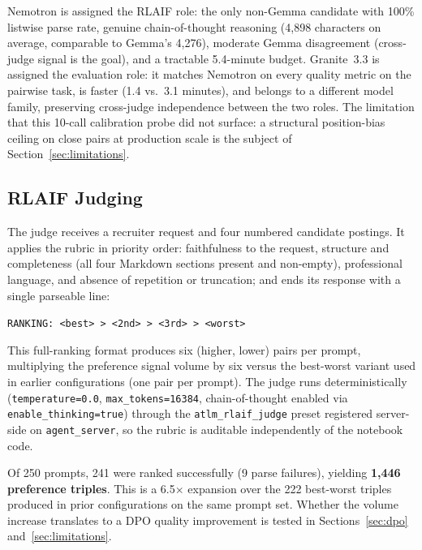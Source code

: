 \documentclass[../main.tex]{subfiles}
\begin{document}
Nemotron is assigned the RLAIF role: the only non-Gemma candidate with 100\% listwise parse rate, genuine chain-of-thought reasoning (4{,}898 characters on average, comparable to Gemma's 4{,}276), moderate Gemma disagreement (cross-judge signal is the goal), and a tractable 5.4-minute budget. Granite~3.3 is assigned the evaluation role: it matches Nemotron on every quality metric on the pairwise task, is faster (1.4 vs.\ 3.1 minutes), and belongs to a different model family, preserving cross-judge independence between the two roles. The limitation that this 10-call calibration probe did not surface: a structural position-bias ceiling on close pairs at production scale is the subject of Section~\ref{sec:limitations}.

\subsection{RLAIF Judging}
\label{sec:rlaif_judging}

The judge receives a recruiter request and four numbered candidate postings. It applies the rubric in priority order: faithfulness to the request, structure and completeness (all four Markdown sections present and non-empty), professional language, and absence of repetition or truncation; and ends its response with a single parseable line:

\begin{center}
\texttt{RANKING: <best> > <2nd> > <3rd> > <worst>}
\end{center}

This full-ranking format produces six (higher, lower) pairs per prompt, multiplying the preference signal volume by six versus the best-worst variant used in earlier configurations (one pair per prompt). The judge runs deterministically (\texttt{temperature=0.0}, \texttt{max\_tokens=16384}, chain-of-thought enabled via \texttt{enable\_thinking=true}) through the \texttt{atlm\_rlaif\_judge} preset registered server-side on \texttt{agent\_server}, so the rubric is auditable independently of the notebook code.

Of 250 prompts, 241 were ranked successfully (9 parse failures), yielding \textbf{1{,}446 preference triples}. This is a 6.5$\times$ expansion over the 222 best-worst triples produced in prior configurations on the same prompt set. Whether the volume increase translates to a DPO quality improvement is tested in Sections~\ref{sec:dpo} and~\ref{sec:limitations}.
\end{document}
